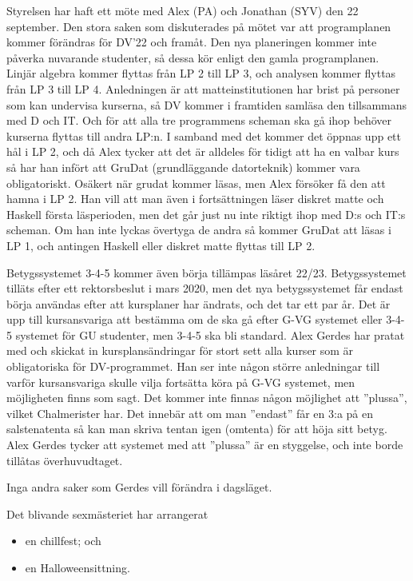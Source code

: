 \documentclass[protokoll]{dvd}
\begin{document}
Styrelsen har haft ett möte med Alex (PA) och Jonathan (SYV) den 22 september.
Den stora saken som diskuterades på mötet var att programplanen kommer förändras för DV'22 och framåt.
Den nya planeringen kommer inte påverka nuvarande studenter, så dessa kör enligt den gamla programplanen.
Linjär algebra kommer flyttas från LP 2 till LP 3, och analysen kommer flyttas från LP 3 till LP 4.
Anledningen är att matteinstitutionen har brist på personer som kan undervisa kurserna, så DV kommer i framtiden samläsa den tillsammans med D och IT.
Och för att alla tre programmens scheman ska gå ihop behöver kurserna flyttas till andra LP:n.
I samband med det kommer det öppnas upp ett hål i LP 2, och då Alex tycker att det är alldeles för tidigt att ha en valbar kurs så har han infört att GruDat (grundläggande datorteknik) kommer vara obligatoriskt.
Osäkert när grudat kommer läsas, men Alex försöker få den att hamna i LP 2.
Han vill att man även i fortsättningen läser diskret matte och Haskell första läsperioden, men det går just nu inte riktigt ihop med D:s och IT:s scheman.
Om han inte lyckas övertyga de andra så kommer GruDat att läsas i LP 1, och antingen Haskell eller diskret matte flyttas till LP 2.

Betygssystemet 3-4-5 kommer även börja tillämpas läsåret 22/23.
Betygssystemet tilläts efter ett rektorsbeslut i mars 2020, men det nya betygssystemet får endast börja användas efter att kursplaner har ändrats, och det tar ett par år.
Det är upp till kursansvariga att bestämma om de ska gå efter G-VG systemet eller 3-4-5 systemet för GU studenter, men 3-4-5 ska bli standard.
Alex Gerdes har pratat med och skickat in kursplansändringar för stort sett alla kurser som är obligatoriska för DV-programmet.
Han ser inte någon större anledningar till varför kursansvariga skulle vilja fortsätta köra på G-VG systemet, men möjligheten finns som sagt.
Det kommer inte finnas någon möjlighet att ''plussa'', vilket Chalmerister har.
Det innebär att om man ''endast'' får en 3:a på en salstenatenta så kan man skriva tentan igen (omtenta) för att höja sitt betyg.
Alex Gerdes tycker att systemet med att ''plussa'' är en styggelse, och inte borde tillåtas överhuvudtaget.

Inga andra saker som Gerdes vill förändra i dagsläget.

Det blivande sexmästeriet har arrangerat


\begin{itemize}
    \item en chillfest; och
    \item en Halloweensittning.
\end{itemize}
\end{document}
